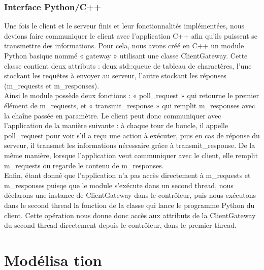 \documentclass{report}
\begin{document}
\subsubsection{Interface Python/C++}
Une fois le client et le serveur finis et leur fonctionnalités implémentées, nous devions faire communiquer le client avec l'application C++ afin qu'ils puissent se transmettre des informations. Pour cela, nous avons créé en C++ un module Python basique nommé « gateway » utilisant une classe ClientGateway. Cette classe contient deux attributs : deux std::queue de tableau de charactères, l'une stockant les requêtes à envoyer au serveur, l'autre stockant les réponses (m\_requests et m\_responses).\\
Ainsi le module possède deux fonctions : « poll\_request » qui retourne le premier élément de m\_requests, et « transmit\_response » qui remplit m\_responses avec la chaîne passée en paramètre. Le client peut donc communiquer avec l'application de la manière suivante : à chaque tour de boucle, il appelle poll\_request pour voir s'il a reçu une action à exécuter, puis en cas de réponse du serveur, il transmet les informations nécessaire grâce à transmit\_response. De la même manière, lorsque l'application veut communiquer avec le client, elle remplit m\_requests ou regarde le contenu de m\_responses.\\
Enfin, étant donné que l'application n'a pas accès directement à m\_requests et m\_responses puisqe que le module s'exécute dans un second thread, nous déclarons une instance de ClientGateway dans le contrôleur, puis nous exécutons dans le second thread la fonction de la classe qui lance le programme Python du client. Cette opération nous donne donc accès aux attributs de la ClientGateway du second thread directement depuis le contrôleur, dans le premier thread.

\section{Modélisa tion} %
\end{document}
